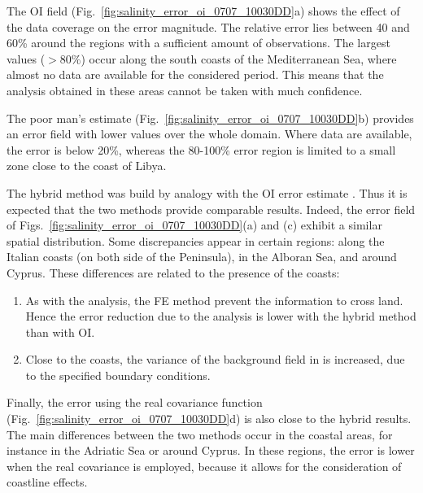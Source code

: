 The OI field (Fig.~\ref{fig:salinity_error_oi_0707_10030DD}a) shows the effect of the data coverage on the error magnitude. The relative error lies between 40 and 60\% around the regions with a sufficient amount of observations. The largest values ($>80\%$) occur along the south coasts of the Mediterranean Sea, where almost no data are available for the considered period. This means that the analysis obtained in these areas cannot be taken with much confidence.

The poor man's estimate (Fig.~\ref{fig:salinity_error_oi_0707_10030DD}b) provides an error field with lower values over the whole domain. Where data are available, the error is below 20\%, whereas the 80-100\% error region is limited to a small zone close to the coast of Libya. 


The hybrid method was build by analogy with the OI error estimate \citep{BRANKART98}. Thus it is expected that the two methods provide comparable results. Indeed, the error field of Figs.~\ref{fig:salinity_error_oi_0707_10030DD}(a) and (c) exhibit a similar spatial distribution. Some discrepancies appear in certain regions: along the Italian coasts (on both side of the Peninsula), in the Alboran Sea, and around Cyprus. These differences are related to the presence of the coasts: 
\begin{enumerate}
\item As with the analysis, the FE method prevent the information to cross land. Hence the error reduction due to the analysis is lower with the hybrid method than with OI. 
\item Close to the coasts, the variance of the background field in \diva is increased, due to the specified boundary conditions. 
\end{enumerate}

Finally, the error using the real covariance function (Fig.~\ref{fig:salinity_error_oi_0707_10030DD}d) is also close to the hybrid results. The main differences between the two methods occur in the coastal areas, for instance in the Adriatic Sea or around Cyprus. In these regions, the error is lower when the real covariance is employed, because it allows for the consideration of coastline effects. 


